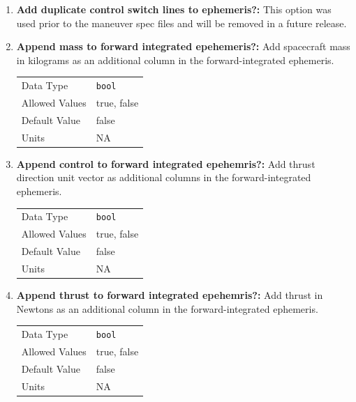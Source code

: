 \begin{enumerate}
\item{\textbf{Add duplicate control switch lines to ephemeris?:}} This option was used prior to the maneuver spec files and will be removed in a future release. 


\item{\textbf{Append mass to forward integrated epehemeris?:}} Add spacecraft mass in kilograms as an additional column in the forward-integrated ephemeris.
    \begin{table}[H]
        \hspace{2cm}
        \begin{tabular}{ll}
        Data Type & \verb|bool| \\
        Allowed Values & true, false \\
        Default Value & false \\
        Units & NA
        \end{tabular}
    \end{table}

\item{\textbf{Append control to forward integrated epehemris?:}} Add thrust direction unit vector as additional columns in the forward-integrated ephemeris.
    \begin{table}[H]
        \hspace{2cm}
        \begin{tabular}{ll}
        Data Type & \verb|bool| \\
        Allowed Values & true, false \\
        Default Value & false \\
        Units & NA
        \end{tabular}
    \end{table}

\item{\textbf{Append thrust to forward integrated epehemris?:}} Add thrust in Newtons as an additional column in the forward-integrated ephemeris.
    \begin{table}[H]
        \hspace{2cm}
        \begin{tabular}{ll}
        Data Type & \verb|bool| \\
        Allowed Values & true, false \\
        Default Value & false \\
        Units & NA
        \end{tabular}
    \end{table}


\end{enumerate}
